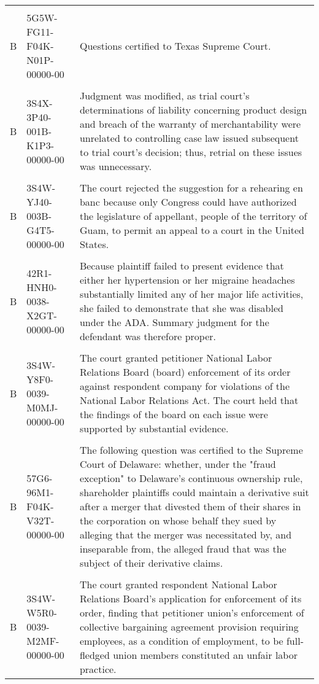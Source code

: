 \documentclass[10pt, letterpaper]{article}
\begin{document}
\begin{spacing}{1.0}
\begin{small}
\begin{longtable}[H]{llp{4in}}
    & &\\[-4pt]
    B & 5G5W-FG11-F04K-N01P-00000-00 & Questions certified to Texas Supreme Court.\\
    & &\\[-4pt]
    B & 3S4X-3P40-001B-K1P3-00000-00 & Judgment was modified, as trial court's determinations of liability concerning product design and breach of the warranty of merchantability were unrelated to controlling case law issued subsequent to trial court's decision; thus, retrial on these issues was unnecessary.\\
    & &\\[-4pt]
    B & 3S4W-YJ40-003B-G4T5-00000-00 & The court rejected the suggestion for a rehearing en banc because only Congress could have authorized the legislature of appellant, people of the territory of Guam, to permit an appeal to a court in the United States.\\
    & &\\[-4pt]
    B & 42R1-HNH0-0038-X2GT-00000-00 & Because plaintiff failed to present evidence that either her hypertension or her migraine headaches substantially limited any of her major life activities, she failed to demonstrate that she was disabled under the ADA. Summary judgment for the defendant was therefore proper.\\
    & &\\[-4pt]
    B & 3S4W-Y8F0-0039-M0MJ-00000-00 & The court granted petitioner National Labor Relations Board (board) enforcement of its order against respondent company for violations of the National Labor Relations Act. The court held that the findings of the board on each issue were supported by substantial evidence.\\
    & &\\[-4pt]
    B & 57G6-96M1-F04K-V32T-00000-00 & The following question was certified to the Supreme Court of Delaware: whether, under the "fraud exception" to Delaware's continuous ownership rule, shareholder plaintiffs could maintain a derivative suit after a merger that divested them of their shares in the corporation on whose behalf they sued by alleging that the merger was necessitated by, and inseparable from, the alleged fraud that was the subject of their derivative claims.\\
    & &\\[-4pt]
    B & 3S4W-W5R0-0039-M2MF-00000-00 & The court granted respondent National Labor Relations Board's application for enforcement of its order, finding that petitioner union's enforcement of collective bargaining agreement provision requiring employees, as a condition of employment, to be full-fledged union members constituted an unfair labor practice.\\

\end{longtable}
\end{small}
\end{spacing}
\end{document}
